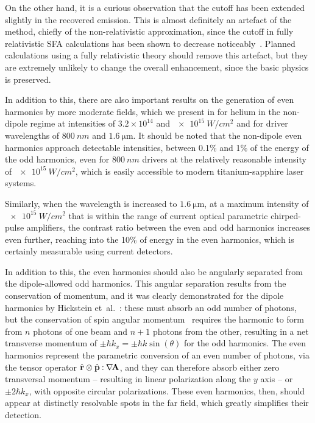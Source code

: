On the other hand, it is a curious observation that the cutoff has been extended slightly in the recovered emission. This is almost definitely an artefact of the method, chiefly of the non-relativistic approximation, since the cutoff in fully relativistic SFA calculations has been shown to decrease noticeably~\cite{milosevic_relativistic_2002-1}. Planned calculations using a fully relativistic theory should remove this artefact, but they are extremely unlikely to change the overall enhancement, since the basic physics is preserved.



In addition to this, there are also important results on the generation of even harmonics by more moderate fields, which we present in  for helium in the non-dipole regime at intensities of $3.2\times 10^{14}$ and $\SI{e15}{W/cm^2}$ and for driver wavelengths of $\SI{800}{nm}$ and $\SI{1.6}{\micro\metre}$. It should be noted that the non-dipole even harmonics approach detectable intensities, between 0.1\% and 1\% of the energy of the odd harmonics, even for $\SI{800}{nm}$ drivers at the relatively reasonable intensity of $\SI{e15}{W/cm^2}$, which is easily accessible to modern titanium-sapphire laser systems.


Similarly, when the wavelength is increased to $\SI{1.6}{\micro\metre}$, at a maximum intensity of $\SI{e15}{W/cm^2}$ that is within the range of current optical parametric chirped-pulse amplifiers, the contrast ratio between the even and odd harmonics increases even further, reaching into the 10\% of energy in the even harmonics, which is certainly measurable using current detectors.



In addition to this, the even harmonics should also be angularly separated from the dipole-allowed odd harmonics. This angular separation results from the conservation of momentum, and it was clearly demonstrated for the dipole harmonics by Hickstein \mbox{et al.}~\cite{hickstein_non-collinear_2015}: these must absorb an odd number of photons, but the conservation of spin angular momentum~\cite{fleischer_spin_2014, Pisanty_spin_conservation_2014} requires the harmonic to form from $n$ photons of one beam and $n+1$ photons from the other, resulting in a net transverse momentum of $\pm\hbar k_x = \pm\hbar k\sin(\theta)$ for the odd harmonics. The even harmonics represent the parametric conversion of an even number of photons, via the tensor operator $\hat{\vb{r}}\otimes\hat{\vb{p}} \mathbin{:} \nabla \hspace{-0.15em} \vb{A}$, and they can therefore absorb either zero transversal momentum -- resulting in linear polarization along the $y$ axis -- or $\pm2\hbar k_x$, with opposite circular polarizations. These even harmonics, then, should appear at distinctly resolvable spots in the far field, which greatly simplifies their detection.

